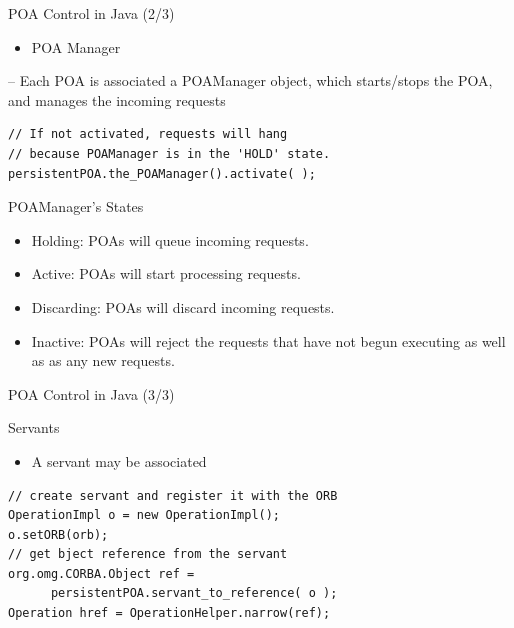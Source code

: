 \documentclass[bigger,hyperref={colorlinks=true, urlcolor=red, plainpages=false, pdfpagelabels, bookmarksnumbered}]{beamer}
\begin{document}
\begin{frame}[fragile,label=sec-4-18]{POA Control in Java (2/3)}
 \begin{itemize}
\item POA Manager
\end{itemize}
-- Each POA is associated a POAManager object, which starts/stops the POA, and manages the incoming requests
\lstset{language=java,label= ,caption= ,numbers=none}
\begin{lstlisting}
// If not activated, requests will hang
// because POAManager is in the 'HOLD' state.
persistentPOA.the_POAManager().activate( );
\end{lstlisting}

\begin{block}{POAManager’s States}
\begin{itemize}
\item Holding: POAs will queue incoming requests.
\item Active: POAs will start processing requests.
\item Discarding: POAs will discard incoming requests.
\item Inactive: POAs will reject the requests that have not begun executing as well as as any new requests.
\end{itemize}
\end{block}
\end{frame}


\begin{frame}[fragile,label=sec-4-19]{POA Control in Java (3/3)}
 \begin{block}{Servants}
\begin{itemize}
\item A servant may be associated
\end{itemize}
\lstset{language=java,label= ,caption= ,numbers=none}
\begin{lstlisting}
// create servant and register it with the ORB
OperationImpl o = new OperationImpl();
o.setORB(orb);
// get bject reference from the servant
org.omg.CORBA.Object ref =
      persistentPOA.servant_to_reference( o );
Operation href = OperationHelper.narrow(ref);
\end{lstlisting}
\end{block}
\end{frame}
\end{document}
